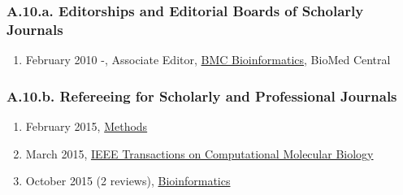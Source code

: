 
\subsubsection*{A.10.a. Editorships and Editorial Boards of Scholarly Journals}


\begin{enumerate}
  \item February 2010 -, Associate Editor, \underline{BMC Bioinformatics}, BioMed Central
\end{enumerate}

\subsubsection*{A.10.b. Refereeing for Scholarly and Professional Journals}
\begin{enumerate}                   
  \item February 2015, \underline{Methods}
  \item March 2015, \underline{IEEE Transactions on Computational Molecular Biology}
  \item October 2015 (2 reviews), \underline{Bioinformatics}
\end{enumerate}

